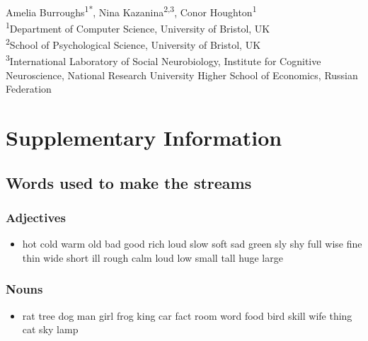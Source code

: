 \documentclass[10pt,letterpaper]{article}
\begin{document}
\begin{flushleft}
{\Large
\textbf{} 
}
\newline
\\
Amelia Burroughs\textsuperscript{1*},
Nina Kazanina\textsuperscript{2,3},
Conor Houghton\textsuperscript{1}
\\
\bigskip
\textsuperscript{1}Department of Computer Science, University of Bristol, UK\\
\textsuperscript{2}School of Psychological Science, University of Bristol, UK\\
\textsuperscript{3}International
Laboratory of Social Neurobiology, Institute for Cognitive
Neuroscience, National Research University Higher School of Economics,
Russian Federation 

\end{flushleft}
\pagebreak{}


\section*{Supplementary Information}


\subsection*{Words used to make the streams}

\subsubsection*{Adjectives}
\begin{itemize}
  \item hot cold warm old bad good rich loud slow soft sad green sly
    shy full wise fine thin wide short ill rough calm loud low small
    tall huge large
\end{itemize}

\subsubsection*{Nouns}
\begin{itemize}
  \item rat tree dog man girl frog king car fact room word food bird
    skill wife thing cat sky lamp
\end{itemize}
\end{document}
